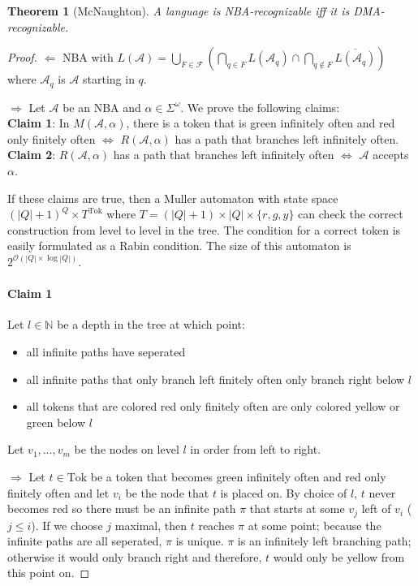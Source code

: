 \documentclass{article}
\newtheorem{theorem}{Theorem}
\begin{document}
\vspace{0.25cm}
\begin{theorem}[McNaughton]
\label{nba_dma}
	A language is NBA-recognizable iff it is DMA-recognizable.
\end{theorem}
\begin{proof}
	$\bm{\Leftarrow}$ NBA with $L(\mathcal{A}) = \bigcup\limits_{F \in \mathcal{F}} \left( \bigcap\limits_{q \in F} L(\mathcal{A}_q) \cap \bigcap\limits_{q \notin F} \overline{L(\mathcal{A}_q)} \right)$ where $\mathcal{A}_q$ is $\mathcal{A}$ starting in $q$.
	
    $\bm{\Rightarrow}$ Let $\mathcal{A}$ be an NBA and $\alpha \in \Sigma^\omega$. We prove the following claims: \\
    \textbf{Claim 1}: In $M(\mathcal{A}, \alpha)$, there is a token that is green infinitely often and red only finitely often $\Leftrightarrow$ $R(\mathcal{A}, \alpha)$ has a path that branches left infinitely often. \\
    \textbf{Claim 2}: $R(\mathcal{A}, \alpha)$ has a path that branches left infinitely often $\Leftrightarrow$ $\mathcal{A}$ accepts $\alpha$.
    
    If these claims are true, then a Muller automaton with state space $(|Q|+1)^Q \times T^\text{Tok}$ where $T = (|Q|+1) \times |Q| \times \{r,g,y\}$ can check the correct construction from level to level in the tree. The condition for a correct token is easily formulated as a Rabin condition. The size of this automaton is $2^{\mathcal{O}(|Q| \times \log |Q|)}$.
    
    \paragraph{Claim 1} Let $l \in \mathbb{N}$ be a depth in the tree at which point:
    \begin{itemize}
    	\item all infinite paths have seperated
    	\item all infinite paths that only branch left finitely often only branch right below $l$
    	\item all tokens that are colored red only finitely often are only colored yellow or green below $l$
    \end{itemize}
    
    Let $v_1, \dots, v_m$ be the nodes on level $l$ in order from left to right.
    
    $\bm{\Rightarrow}$ Let $t \in \text{Tok}$ be a token that becomes green infinitely often and red only finitely often and let $v_i$ be the node that $t$ is placed on. By choice of $l$, $t$ never becomes red so there must be an infinite path $\pi$ that starts at some $v_j$ left of $v_i$ ($j \leq i$). If we choose $j$ maximal, then $t$ reaches $\pi$ at some point; because the infinite paths are all seperated, $\pi$ is unique. $\pi$ is an infinitely left branching path; otherwise it would only branch right and therefore, $t$ would only be yellow from this point on.
    

\end{proof}
\end{document}
